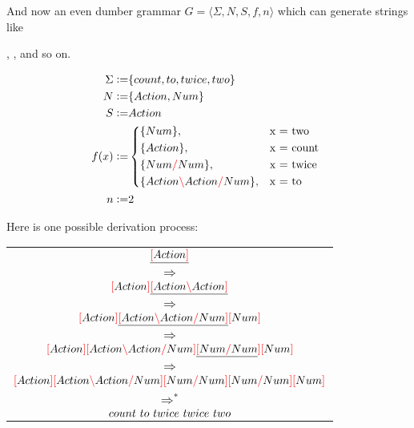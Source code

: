 \documentclass[main.tex]{subfiles}
\begin{document}
\begin{example}
    \label{ex:derivsimple}

    And now an even dumber grammar $G = \langle \Sigma, N, S, f, n \rangle$
    which can generate strings like

    ,
    , 
    and so on.

    \begin{align*}
        \Sigma \defeq& \{ count, to, twice, two \} \\
        N \defeq& \{ Action, Num \} \\
        S \defeq& Action \\
        f(x) \defeq&
            \begin{cases*}
                \{ Num \},& x = two \\
                \{ Action \},& x = count \\
                \{ Num \rc Num \},& x = twice \\
                \{ Action \lc Action \rc Num \},& x = to \\
            \end{cases*} \\
        n \defeq& 2 \\
    \end{align*}

    Here is one possible derivation process:
    \begin{center}
        \begin{tabular}{c}
            $\underline{\textcolor{red}{[} Action \textcolor{red}{]}}$ \\ $\Rightarrow$ \\
            $\textcolor{red}{[} Action \textcolor{red}{]} \underline{\textcolor{red}{[} Action \textcolor{red}{\backslash} Action \textcolor{red}{]}}$ \\ $\Rightarrow$ \\
            $\textcolor{red}{[} Action \textcolor{red}{]} \underline{\textcolor{red}{[} Action \textcolor{red}{\backslash} Action \textcolor{red}{/} Num \textcolor{red}{]}} \textcolor{red}{[} Num \textcolor{red}{]}$ \\ $\Rightarrow$ \\
            $\textcolor{red}{[} Action \textcolor{red}{]} \textcolor{red}{[} Action \textcolor{red}{\backslash} Action \textcolor{red}{/} Num \textcolor{red}{]} \underline{\textcolor{red}{[} Num \textcolor{red}{/} Num} \textcolor{red}{]} \textcolor{red}{[} Num \textcolor{red}{]}$ \\ $\Rightarrow$ \\
            $\textcolor{red}{[} Action \textcolor{red}{]} \textcolor{red}{[} Action \textcolor{red}{\backslash} Action \textcolor{red}{/} Num \textcolor{red}{]} \textcolor{red}{[} Num \textcolor{red}{/} Num \textcolor{red}{]} \textcolor{red}{[} Num \textcolor{red}{/} Num \textcolor{red}{]} \textcolor{red}{[} Num \textcolor{red}{]}$ \\ $\Rightarrow^*$ \\
            $count \text{ } to \text{ } twice \text{ } twice \text{ } two$ \\
        \end{tabular}
    \end{center}
\end{example}
\end{document}
